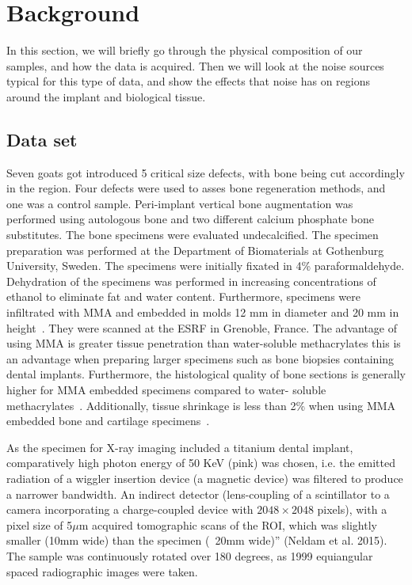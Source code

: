 \section{Background}
\label{sec:background}

In this section, we will briefly go through the physical composition of our samples, and how the
data is acquired. Then we will look at the noise sources typical for this type of data, and show
the effects that noise has on regions around the implant and biological tissue.

\subsection{Data set}


Seven goats got introduced 5 critical size defects, with bone being cut accordingly in the region.
 Four defects were used to asses bone regeneration methods, and one was a control sample.
 Peri-implant vertical bone augmentation was performed using autologous bone and two different
 calcium phosphate bone substitutes. The bone specimens were evaluated undecalcified. The
 specimen preparation was performed at the Department of Biomaterials at Gothenburg University,
 Sweden. The specimens were initially fixated in 4\% paraformaldehyde. Dehydration of the
 specimens was performed in increasing concentrations of ethanol to eliminate fat and water
 content. Furthermore, specimens were infiltrated with MMA and embedded in molds 12 mm in
 diameter and 20 mm in height~\cite{donath1982,donath1993,erben1997}. They were scanned at the ESRF
 in Grenoble, France. The advantage of using MMA is greater tissue penetration than water-soluble
 methacrylates this is an advantage when preparing larger specimens such as bone biopsies
 containing dental implants. Furthermore, the histological quality of bone sections is generally
 higher for MMA embedded specimens compared to water- soluble methacrylates~\cite{erben1997}.
 Additionally, tissue shrinkage is less than 2\% when using MMA embedded bone and cartilage
 specimens~\cite{ferguson1999}.


As the specimen for X-ray imaging included a titanium dental implant, comparatively high photon
 energy of 50 KeV (pink) was chosen, i.e. the
 emitted radiation of a wiggler insertion device (a
 magnetic device) was filtered    to produce a narrower bandwidth. An indirect detector (lens-coupling
 of a scintillator to a camera incorporating a charge-coupled device with $2048 \times 2048$ pixels),
 with a pixel size of 5$\mu$m acquired tomographic scans of the ROI, which was slightly smaller (10mm wide)
 than the specimen (~20mm wide)” (Neldam et al. 2015). The sample was continuously rotated over
 180 degrees, as 1999 equiangular spaced radiographic images were taken.

